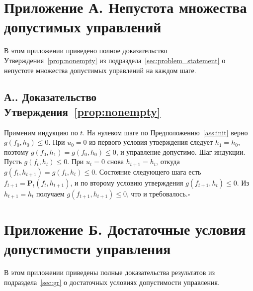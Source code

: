 \documentclass[a4paper,14pt,oneside,openany]{extarticle}
\newcommand{\bP}{\mathbf{P}}
\begin{document}
\newpage




\newpage
\cleardoublepage
{}
{}
\section*{Приложение А. Непустота множества допустимых управлений}

В этом приложении приведено полное доказательство Утверждения~\ref{prop:nonempty} из подраздела~\ref{sec:problem_statement} о непустоте множества допустимых управлений на каждом шаге.

\setcounter{appthm}{0}
\renewcommand{\theappthm}{А.}

\subsection*{\theappthm. Доказательство Утверждения~\ref{prop:nonempty}}\label{app:proof_nonempty}

Применим индукцию по $t$. На нулевом шаге по Предположению~\ref{ass:init} верно $g(f_0, h_0) \le 0$. При $u_0 = 0$ из первого условия утверждения следует $h_1 = h_0$, поэтому $g(f_0, h_1) = g(f_0, h_0) \le 0$, и управление допустимо. Шаг индукции. Пусть $g(f_t, h_t) \le 0$. При $u_t = 0$ снова $h_{t+1} = h_t$, откуда $g(f_t, h_{t+1}) = g(f_t, h_t) \le 0$. Состояние следующего шага есть $f_{t+1} = \bP_t(f_t, h_{t+1})$, и по второму условию утверждения $g(f_{t+1}, h_t) \le 0$. Из $h_{t+1} = h_t$ получаем $g(f_{t+1}, h_{t+1}) \le 0$, что и требовалось.\hfill$\square$

\newpage
\cleardoublepage
{}
{}
\section*{Приложение Б. Достаточные условия допустимости управления}

В этом приложении приведены полные доказательства результатов из подраздела~\ref{sec:gr} о достаточных условиях допустимости управления.
\end{document}

